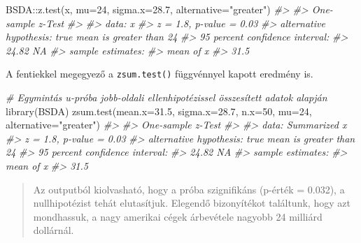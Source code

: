 \documentclass[
]{book}
\newenvironment{Shaded}{\begin{snugshade}}{\end{snugshade}}
\newcommand{\AttributeTok}[1]{\textcolor[rgb]{0.77,0.63,0.00}{#1}}
\newcommand{\CommentTok}[1]{\textcolor[rgb]{0.56,0.35,0.01}{\textit{#1}}}
\newcommand{\DecValTok}[1]{\textcolor[rgb]{0.00,0.00,0.81}{#1}}
\newcommand{\FloatTok}[1]{\textcolor[rgb]{0.00,0.00,0.81}{#1}}
\newcommand{\FunctionTok}[1]{\textcolor[rgb]{0.00,0.00,0.00}{#1}}
\newcommand{\NormalTok}[1]{#1}
\newcommand{\SpecialCharTok}[1]{\textcolor[rgb]{0.00,0.00,0.00}{#1}}
\newcommand{\StringTok}[1]{\textcolor[rgb]{0.31,0.60,0.02}{#1}}
\begin{document}
\begin{Shaded}
\begin{Highlighting}[]
\NormalTok{BSDA}\SpecialCharTok{::}\FunctionTok{z.test}\NormalTok{(x, }\AttributeTok{mu=}\DecValTok{24}\NormalTok{, }\AttributeTok{sigma.x=}\FloatTok{28.7}\NormalTok{, }\AttributeTok{alternative=}\StringTok{"greater"}\NormalTok{)  }
\CommentTok{\#\textgreater{} }
\CommentTok{\#\textgreater{}  One{-}sample z{-}Test}
\CommentTok{\#\textgreater{} }
\CommentTok{\#\textgreater{} data:  x}
\CommentTok{\#\textgreater{} z = 1.8, p{-}value = 0.03}
\CommentTok{\#\textgreater{} alternative hypothesis: true mean is greater than 24}
\CommentTok{\#\textgreater{} 95 percent confidence interval:}
\CommentTok{\#\textgreater{}  24.82    NA}
\CommentTok{\#\textgreater{} sample estimates:}
\CommentTok{\#\textgreater{} mean of x }
\CommentTok{\#\textgreater{}      31.5}
\end{Highlighting}
\end{Shaded}

A fentiekkel megegyező a \texttt{zsum.test()} függvénnyel kapott eredmény is.

\begin{Shaded}
\begin{Highlighting}[]
\CommentTok{\# Egymintás u{-}próba jobb{-}oldali ellenhipotézissel összesített adatok alapján}
\FunctionTok{library}\NormalTok{(BSDA)}
\FunctionTok{zsum.test}\NormalTok{(}\AttributeTok{mean.x=}\FloatTok{31.5}\NormalTok{, }\AttributeTok{sigma.x=}\FloatTok{28.7}\NormalTok{, }\AttributeTok{n.x=}\DecValTok{50}\NormalTok{, }\AttributeTok{mu=}\DecValTok{24}\NormalTok{, }\AttributeTok{alternative=}\StringTok{"greater"}\NormalTok{)  }
\CommentTok{\#\textgreater{} }
\CommentTok{\#\textgreater{}  One{-}sample z{-}Test}
\CommentTok{\#\textgreater{} }
\CommentTok{\#\textgreater{} data:  Summarized x}
\CommentTok{\#\textgreater{} z = 1.8, p{-}value = 0.03}
\CommentTok{\#\textgreater{} alternative hypothesis: true mean is greater than 24}
\CommentTok{\#\textgreater{} 95 percent confidence interval:}
\CommentTok{\#\textgreater{}  24.82    NA}
\CommentTok{\#\textgreater{} sample estimates:}
\CommentTok{\#\textgreater{} mean of x }
\CommentTok{\#\textgreater{}      31.5}
\end{Highlighting}
\end{Shaded}

\begin{quote}
Az outputból kiolvasható, hogy a próba szignifikáns (p-érték = 0.032), a nullhipotézist tehát elutasítjuk. Elegendő bizonyítékot találtunk, hogy azt mondhassuk, a nagy amerikai cégek árbevétele nagyobb 24 milliárd dollárnál.
\end{quote}
\end{document}
